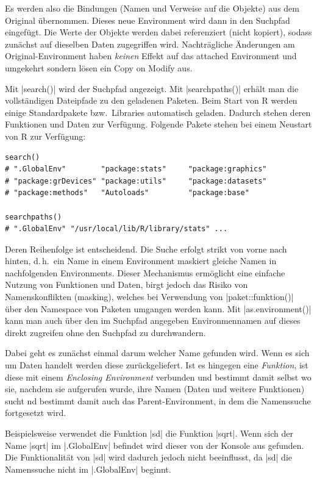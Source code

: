 \documentclass[10pt,twocolumn]{scrartcl}
\renewcommand{\lstinline}{\mycoloredinline}
\begin{document}
Es werden also die Bindungen (Namen und Verweise auf die Objekte) aus dem Original übernommen. Dieses neue Environment wird dann in den Suchpfad eingefügt. Die Werte der Objekte werden dabei referenziert (nicht kopiert), sodass zunächst auf dieselben Daten zugegriffen wird. Nachträgliche Änderungen am Original-Environment haben \emph{keinen} Effekt auf das attached Environment und umgekehrt sondern lösen ein Copy on Modify aus.

Mit \lstinline|search()| wird der Suchpfad angezeigt. Mit \lstinline|searchpaths()| erhält man die vollständigen Dateipfade zu den geladenen Paketen. Beim Start von R werden einige Standardpakete bzw.\ Libraries automatisch geladen. Dadurch stehen deren Funktionen und Daten zur Verfügung. Folgende Pakete stehen bei einem Neustart von R zur Verfügung:

\begin{lstlisting}
search()
# ".GlobalEnv"        "package:stats"     "package:graphics"
# "package:grDevices" "package:utils"     "package:datasets"
# "package:methods"   "Autoloads"         "package:base"

searchpaths()
# ".GlobalEnv" "/usr/local/lib/R/library/stats" ...
\end{lstlisting}

Deren Reihenfolge ist entscheidend. Die Suche erfolgt strikt von vorne nach hinten, d.\,h.\ ein Name in einem Environment maskiert gleiche Namen in nachfolgenden Environments. Dieser Mechanismus ermöglicht eine einfache Nutzung von Funktionen und Daten, birgt jedoch das Risiko von Namenskonflikten (masking), welches bei Verwendung von \lstinline|paket::funktion()| über den Namespace von Paketen umgangen werden kann. Mit \lstinline|as.environment()| kann man auch über den im Suchpfad angegeben Environmennamen auf dieses direkt zugreifen ohne den Suchpfad zu durchwandern.

Dabei geht es zunächst einmal darum welcher Name gefunden wird. Wenn es sich um Daten handelt werden diese zurückgeliefert. Ist es hingegen eine \emph{Funktion}, ist diese mit einem \emph{Enclosing Environment} verbunden und bestimmt damit selbst wo sie, nachdem sie aufgerufen wurde, ihre Namen (Daten und weitere Funktionen) sucht nd bestimmt damit auch das Parent-Environment, in dem die Namenssuche fortgesetzt wird.

Beispielsweise verwendet die Funktion \lstinline|sd| die Funktion \lstinline|sqrt|. Wenn sich der Name \lstinline|sqrt| im \lstinline|.GlobalEnv| befindet wird dieser von der Konsole aus gefunden. Die Funktionalität von \lstinline|sd| wird dadurch jedoch nicht beeinflusst, da \lstinline|sd| die Namenssuche nicht im \lstinline|.GlobalEnv| beginnt.
\end{document}

